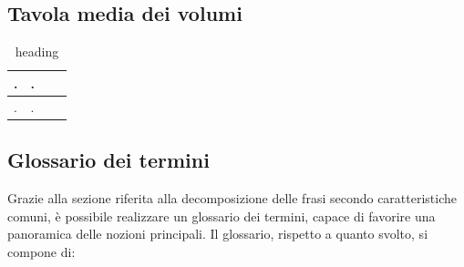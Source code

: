 \documentclass{article}
\begin{document}
\subsection{Tavola media dei volumi}
\large
\begin{table}[h]
    \centering
    \begin{tabularx}{\textwidth}{|X|X|X|X|}
        \hline
        . & . \\
        \hline
        . & . \\
    \end{tabularx}
    \caption{heading}
\end{table}

\subsection{Glossario dei termini}
\large
Grazie alla sezione riferita alla decomposizione delle frasi secondo caratteristiche comuni, è possibile realizzare un glossario dei termini, capace di favorire una panoramica delle nozioni principali. Il glossario, rispetto a quanto svolto, si compone di:
\end{document}
